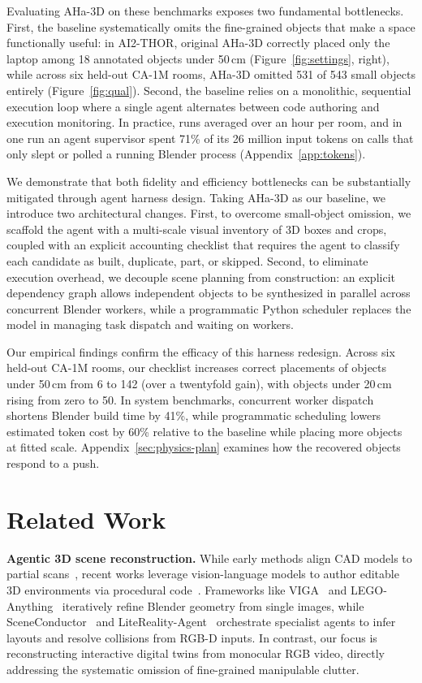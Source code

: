 \documentclass{article}
\begin{document}
Evaluating AHa-3D on these benchmarks exposes two fundamental bottlenecks. First, the baseline systematically omits the fine-grained objects that make a space functionally useful: in AI2-THOR, original AHa-3D correctly placed only the laptop among 18 annotated objects under 50\,cm (Figure~\ref{fig:settings}, right), while across six held-out CA-1M rooms, AHa-3D omitted 531 of 543 small objects entirely (Figure~\ref{fig:qual}). Second, the baseline relies on a monolithic, sequential execution loop where a single agent alternates between code authoring and execution monitoring. In practice, runs averaged over an hour per room, and in one run an agent supervisor spent 71\% of its 26 million input tokens on calls that only slept or polled a running Blender process (Appendix~\ref{app:tokens}).

We demonstrate that both fidelity and efficiency bottlenecks can be substantially mitigated through agent harness design. Taking AHa-3D as our baseline, we introduce two architectural changes. First, to overcome small-object omission, we scaffold the agent with a multi-scale visual inventory of 3D boxes and crops, coupled with an explicit accounting checklist that requires the agent to classify each candidate as built, duplicate, part, or skipped. Second, to eliminate execution overhead, we decouple scene planning from construction: an explicit dependency graph allows independent objects to be synthesized in parallel across concurrent Blender workers, while a programmatic Python scheduler replaces the model in managing task dispatch and waiting on workers.

Our empirical findings confirm the efficacy of this harness redesign. Across six held-out CA-1M rooms, our checklist increases correct placements of objects under 50\,cm from 6 to 142 (over a twentyfold gain), with objects under 20\,cm rising from zero to 50. In system benchmarks, concurrent worker dispatch shortens Blender build time by 41\%, while programmatic scheduling lowers estimated token cost by 60\% relative to the baseline while placing more objects at fitted scale. Appendix~\ref{sec:physics-plan} examines how the recovered objects respond to a push.

\section{Related Work}
\textbf{Agentic 3D scene reconstruction.}
While early methods align CAD models to partial scans~\cite{scan2cad,litereality}, recent works leverage vision-language models to author editable 3D environments via procedural code~\cite{aha3d,legoanything,scenesmith}. Frameworks like VIGA~\cite{viga} and LEGO-Anything~\cite{legoanything} iteratively refine Blender geometry from single images, while SceneConductor~\cite{sceneconductor} and LiteReality-Agent~\cite{literealityagent} orchestrate specialist agents to infer layouts and resolve collisions from RGB-D inputs. In contrast, our focus is reconstructing interactive digital twins from monocular RGB video, directly addressing the systematic omission of fine-grained manipulable clutter.
\end{document}
